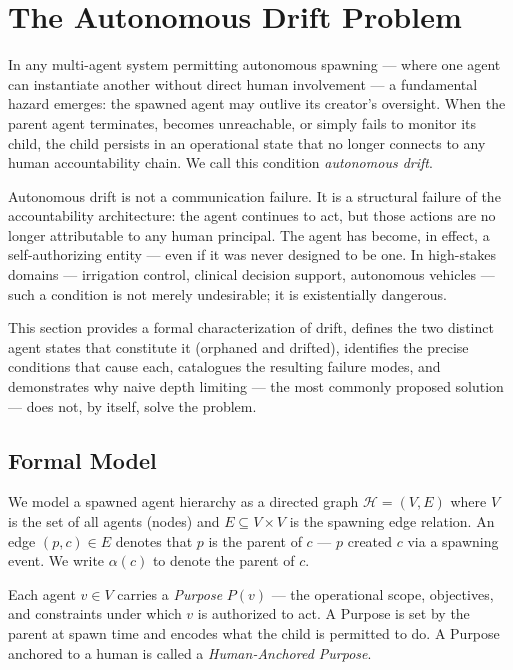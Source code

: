 \section{The Autonomous Drift Problem}
\label{sec:autonomous-drift}

In any multi-agent system permitting autonomous spawning — where one agent can instantiate another without direct human involvement — a fundamental hazard emerges: the spawned agent may outlive its creator's oversight. When the parent agent terminates, becomes unreachable, or simply fails to monitor its child, the child persists in an operational state that no longer connects to any human accountability chain. We call this condition \textit{autonomous drift}.

Autonomous drift is not a communication failure. It is a structural failure of the accountability architecture: the agent continues to act, but those actions are no longer attributable to any human principal. The agent has become, in effect, a self-authorizing entity — even if it was never designed to be one. In high-stakes domains — irrigation control, clinical decision support, autonomous vehicles — such a condition is not merely undesirable; it is existentially dangerous.

This section provides a formal characterization of drift, defines the two distinct agent states that constitute it (orphaned and drifted), identifies the precise conditions that cause each, catalogues the resulting failure modes, and demonstrates why naive depth limiting — the most commonly proposed solution — does not, by itself, solve the problem.

\subsection{Formal Model}

We model a spawned agent hierarchy as a directed graph $\mathcal{H} = (V, E)$ where $V$ is the set of all agents (nodes) and $E \subseteq V \times V$ is the spawning edge relation. An edge $(p, c) \in E$ denotes that $p$ is the parent of $c$ — $p$ created $c$ via a spawning event. We write $\alpha(c)$ to denote the parent of $c$.

Each agent $v \in V$ carries a \textit{Purpose} $P(v)$ — the operational scope, objectives, and constraints under which $v$ is authorized to act. A Purpose is set by the parent at spawn time and encodes what the child is permitted to do. A Purpose anchored to a human is called a \textit{Human-Anchored Purpose}.


